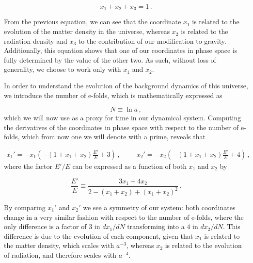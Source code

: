 \begin{equation}
    \label{eq:dynamical-system-conservation}
    x_1 + x_2 + x_3 = 1 \,.
\end{equation}

From the previous equation, we can see that the coordinate $x_1$ is related to the evolution of the matter density in the universe, whereas $x_2$ is related to the radiation density and $x_3$ to the contribution of our modification to gravity. Additionally, this equation shows that one of our coordinates in phase space is fully determined by the value of the other two. As such, without loss of generality, we choose to work only with $x_1$ and $x_2$.

In order to understand the evolution of the background dynamics of this universe, we introduce the number of e-folds, which is mathematically expressed as

\begin{equation}
    N \equiv \ln{a} \,,
\end{equation}
which we will now use as a proxy for time in our dynamical system. Computing the derivatives of the coordinates in phase space with respect to the number of e-folds, which from now one we will denote with a prime, reveals that

\begin{gather}
    x_1' = - x_1 \left(-(1+x_1+x_2)\frac{E'}{E} + 3\right) \,, \hspace{1cm}
    x_2' = - x_2 \left(-(1+x_1+x_2)\frac{E'}{E} + 4\right) \,,
\end{gather}
where the factor $E'/E$ can be expressed as a function of both $x_1$ and $x_2$ by


\begin{equation}
    \frac{E'}{E} \equiv \frac{3 x_1 + 4 x_2}{2 - (x_1 + x_2) + (x_1 + x_2)^2} \,.
\end{equation}

By comparing $x_1'$ and $x_2'$ we see a symmetry of our system: both coordinates change in a very similar fashion with respect to the number of e-folds, where the only difference is a factor of $3$ in $dx_1/dN$ transforming into a $4$ in $dx_2/dN$. This difference is due to the evolution of each component, given that $x_1$ is related to the matter density, which scales with $a^{-3}$, whereas $x_2$ is related to the evolution of radiation, and therefore scales with $a^{-4}$.


